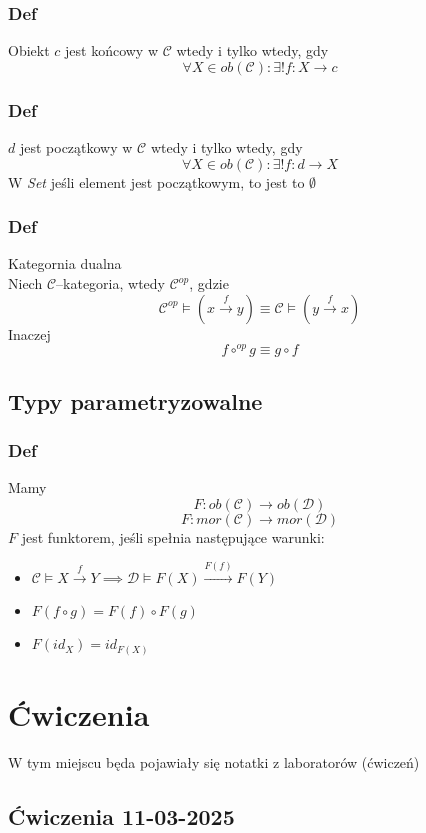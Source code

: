 \documentclass[11pt,a4paper]{article}
\begin{document}
\subsubsection*{Def}
Obiekt $c$ jest końcowy w $\mathcal{C}$ wtedy i tylko wtedy, gdy
\[
    \forall X \in ob(\mathcal{C}): \exists ! f: X \rightarrow c
\]
\subsubsection*{Def}
$d$ jest początkowy w $\mathcal{C}$ wtedy i tylko wtedy, gdy
\[
    \forall X \in ob(\mathcal{C}): \exists ! f: d \rightarrow X
\]
W \textit{Set} jeśli element jest początkowym, to jest to $\emptyset$
\subsubsection*{Def}
Kategornia dualna\\
Niech $\mathcal{C}$--kategoria, wtedy $\mathcal{C}^{op}$, gdzie
\[
    \mathcal{C}^{op} \models (x \xrightarrow{f} y) \equiv \mathcal{C} \models (y \xrightarrow{f} x)
\]
Inaczej
\[
    f \circ^{op} g \equiv g \circ f
\]

\subsection{Typy parametryzowalne}
\subsubsection*{Def}
Mamy
\[
    F: ob(\mathcal{C}) \rightarrow ob(\mathcal{D})
\]
\[
    F: mor(\mathcal{C}) \rightarrow mor(\mathcal{D})
\]
$F$ jest funktorem, jeśli spełnia następujące warunki:
\begin{itemize}
    \item $\mathcal{C} \models X \xrightarrow{f} Y \implies \mathcal{D} \models F(X) \xrightarrow{F(f)} F(Y)$
    \item $F(f \circ g) = F(f) \circ F(g)$
    \item $F(id_X) = id_{F(X)}$
\end{itemize}


\section{Ćwiczenia}
W tym miejscu będa pojawiały się notatki z laboratorów (ćwiczeń)
\subsection{Ćwiczenia 11-03-2025}
\end{document}
